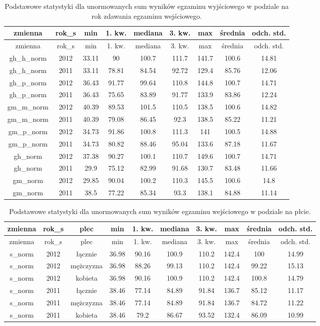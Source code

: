 \documentclass[]{article}
\begin{document}
\begin{longtable}[c]{@{}ccccccccc@{}}
\caption{Podstawowe statystyki dla unormowanych sum wyników egzaminu
wyjściowego w podziale na rok zdawania egzaminu
wejściowego.}\tabularnewline
\toprule
zmienna & rok\_s & min & 1. kw. & mediana & 3. kw. & max & średnia &
odch. std.\tabularnewline
\midrule
\endfirsthead
\toprule
zmienna & rok\_s & min & 1. kw. & mediana & 3. kw. & max & średnia &
odch. std.\tabularnewline
\midrule
\endhead
gh\_h\_norm & 2012 & 33.11 & 90 & 100.7 & 111.7 & 141.7 & 100.6 &
14.81\tabularnewline
gh\_h\_norm & 2011 & 33.11 & 78.81 & 84.54 & 92.72 & 129.4 & 85.76 &
12.06\tabularnewline
gh\_p\_norm & 2012 & 36.43 & 91.77 & 99.64 & 110.8 & 144.8 & 100.7 &
14.71\tabularnewline
gh\_p\_norm & 2011 & 36.43 & 75.65 & 83.89 & 91.77 & 133.9 & 83.86 &
12.24\tabularnewline
gm\_m\_norm & 2012 & 40.39 & 89.53 & 101.5 & 110.5 & 138.5 & 100.6 &
14.82\tabularnewline
gm\_m\_norm & 2011 & 40.39 & 79.08 & 86.45 & 92.3 & 138.5 & 85.22 &
11.21\tabularnewline
gm\_p\_norm & 2012 & 34.73 & 91.86 & 100.8 & 111.3 & 141 & 100.5 &
14.88\tabularnewline
gm\_p\_norm & 2011 & 34.73 & 80.82 & 88.46 & 95.04 & 133.6 & 87.18 &
11.67\tabularnewline
gh\_norm & 2012 & 37.38 & 90.27 & 100.1 & 110.7 & 149.6 & 100.7 &
14.71\tabularnewline
gh\_norm & 2011 & 29.9 & 75.12 & 82.99 & 91.68 & 130.7 & 83.48 &
11.66\tabularnewline
gm\_norm & 2012 & 29.85 & 90.04 & 100.2 & 110.3 & 145.5 & 100.6 &
14.8\tabularnewline
gm\_norm & 2011 & 38.5 & 77.22 & 85.34 & 93.3 & 138.1 & 84.88 &
11.14\tabularnewline
\bottomrule
\end{longtable}

\begin{longtable}[c]{@{}cccccccccc@{}}
\caption{Podstawowe statystyki dla unormowanych sum wyników egzaminu
wejściowego w podziale na płcie.}\tabularnewline
\toprule
zmienna & rok\_s & plec & min & 1. kw. & mediana & 3. kw. & max &
średnia & odch. std.\tabularnewline
\midrule
\endfirsthead
\toprule
zmienna & rok\_s & plec & min & 1. kw. & mediana & 3. kw. & max &
średnia & odch. std.\tabularnewline
\midrule
\endhead
s\_norm & 2012 & łącznie & 36.98 & 90.16 & 100.9 & 110.2 & 142.4 & 100 &
14.99\tabularnewline
s\_norm & 2012 & mężczyzna & 36.98 & 88.26 & 99.13 & 110.2 & 142.4 &
99.22 & 15.13\tabularnewline
s\_norm & 2012 & kobieta & 36.98 & 90.16 & 100.9 & 110.2 & 142.4 & 100.8
& 14.79\tabularnewline
s\_norm & 2011 & łącznie & 38.46 & 77.14 & 84.89 & 91.84 & 136.7 & 85.12
& 11.17\tabularnewline
s\_norm & 2011 & mężczyzna & 38.46 & 77.14 & 84.89 & 91.84 & 136.7 &
84.72 & 11.22\tabularnewline
s\_norm & 2011 & kobieta & 38.46 & 79.2 & 86.67 & 93.52 & 132.4 & 86.09
& 10.99\tabularnewline
\bottomrule
\end{longtable}
\end{document}
